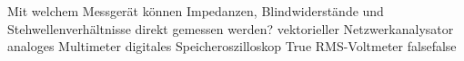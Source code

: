     {Mit welchem Messgerät können Impedanzen, Blindwiderstände und Stehwellenverhältnisse direkt gemessen werden?}
    {vektorieller Netzwerkanalysator}
    {analoges Multimeter}
    {digitales Speicheroszilloskop}
    {True RMS-Voltmeter}
    {false}{false}